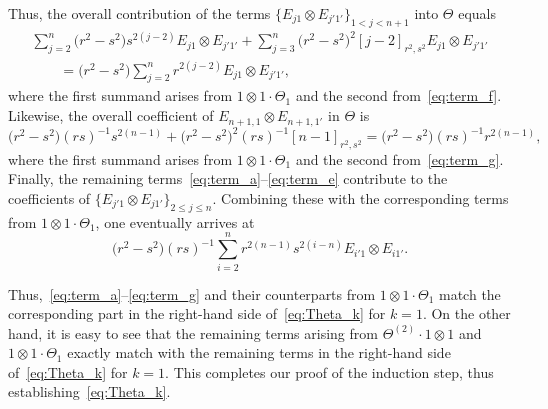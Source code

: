 \documentclass[pdftex]{sigma}
\numberwithin{equation}{section}
\begin{document}
Thus, the overall contribution of the terms $\{E_{j1} \otimes E_{j'1'}\}_{1<j<n+1}$ into $\Theta$ equals
\begin{gather*}
 \sum_{j = 2}^{n} \bigl(r^{2} - s^{2}\bigr)s^{2(j-2)} E_{j1} \otimes E_{j'1'} +
 \sum_{j = 3}^{n}\bigl(r^{2} - s^{2}\bigr)^{2}[j - 2]_{r^{2},s^{2}} E_{j1} \otimes E_{j'1'}\\
 \qquad{} = \bigl(r^{2} - s^{2}\bigr)\sum_{j = 2}^{n}r^{2(j - 2)}E_{j1} \otimes E_{j'1'},
\end{gather*}
where the first summand arises from $1 \otimes 1 \cdot \Theta_{1}$ and the second from~\eqref{eq:term_f}.
Likewise, the overall coefficient of $E_{n + 1,1} \otimes E_{n + 1,1'}$ in $\Theta$ is
\begin{displaymath}
 \bigl(r^{2} - s^{2}\bigr)(rs)^{-1}s^{2(n-1)} + \bigl(r^{2} - s^{2}\bigr)^{2}(rs)^{-1}[n-1]_{r^{2},s^{2}}=
 \bigl(r^{2} - s^{2}\bigr)(rs)^{-1}r^{2(n - 1)},
\end{displaymath}
where the first summand arises from $1 \otimes 1 \cdot \Theta_{1}$ and the second from~\eqref{eq:term_g}.
Finally, the remaining terms~\eqref{eq:term_a}--\eqref{eq:term_e} contribute to the coefficients of $\{E_{j'1} \otimes E_{j1'}\}_{2\leq j\leq n}$. Combining these with the corresponding terms from $1 \otimes 1 \cdot \Theta_{1}$, one eventually arrives at
\begin{displaymath}
 \bigl(r^{2} - s^{2}\bigr)(rs)^{-1} \sum_{i = 2}^{n} r^{2(n - 1)}s^{2(i-n)} E_{i'1} \otimes E_{i1'}.
\end{displaymath}

Thus,~\eqref{eq:term_a}--\eqref{eq:term_g} and their counterparts from $1 \otimes 1 \cdot \Theta_{1}$ match the corresponding part in the right-hand side of~\eqref{eq:Theta_k} for $k=1$. On the other hand, it is easy to see that the remaining terms arising from $\Theta^{(2)} \cdot 1 \otimes 1$ and $1 \otimes 1 \cdot \Theta_{1}$ exactly match with the remaining terms in the right-hand side of~\eqref{eq:Theta_k} for $k=1$. This completes our proof of the induction step, thus establishing~\eqref{eq:Theta_k}.
\end{document}
